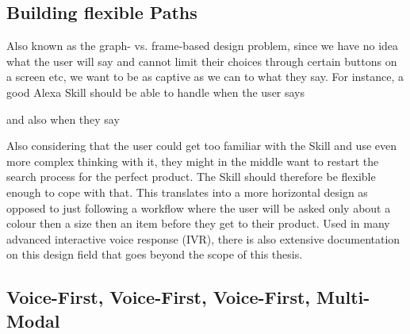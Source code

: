 \subsection*{Building flexible Paths}
Also known as the graph- vs. frame-based design problem, since we have no idea what the user will say and cannot limit their choices through certain buttons on a screen etc, we want to be as captive as we can to what they say. For instance, a good Alexa Skill should be able to handle when the user says



\noindent and also when they say 



Also considering that the user could get too familiar with the Skill and use even more complex thinking with it, they might in the middle want to restart the search process for the perfect product. The Skill should therefore be flexible enough to cope with that. This translates into a more horizontal design as opposed to just following a workflow where the user will be asked only about a colour then a size then an item before they get to their product. Used in many advanced interactive voice response (IVR), there is also extensive documentation on this design field that goes beyond the scope of this thesis.



\subsection*{Voice-First, Voice-First, Voice-First, Multi-Modal}

